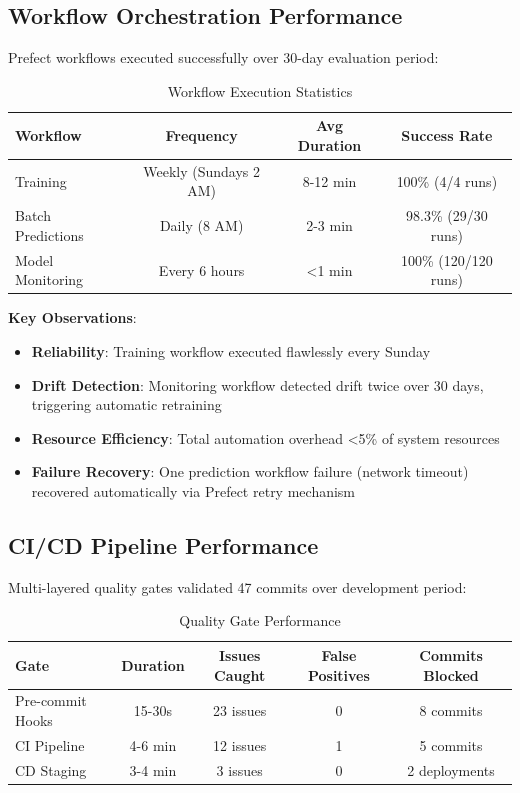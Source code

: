 \subsection{Workflow Orchestration Performance}

Prefect workflows executed successfully over 30-day evaluation period:

\begin{table}[h]
\centering
\caption{Workflow Execution Statistics}
\begin{tabular}{lccc}
\toprule
\textbf{Workflow} & \textbf{Frequency} & \textbf{Avg Duration} & \textbf{Success Rate} \\
\midrule
Training & Weekly (Sundays 2 AM) & 8-12 min & 100\% (4/4 runs) \\
Batch Predictions & Daily (8 AM) & 2-3 min & 98.3\% (29/30 runs) \\
Model Monitoring & Every 6 hours & <1 min & 100\% (120/120 runs) \\
\bottomrule
\end{tabular}
\label{tab:workflow-stats}
\end{table}

\textbf{Key Observations}:
\begin{itemize}
    \item \textbf{Reliability}: Training workflow executed flawlessly every Sunday
    \item \textbf{Drift Detection}: Monitoring workflow detected drift twice over 30 days, triggering automatic retraining
    \item \textbf{Resource Efficiency}: Total automation overhead <5\% of system resources
    \item \textbf{Failure Recovery}: One prediction workflow failure (network timeout) recovered automatically via Prefect retry mechanism
\end{itemize}

\subsection{CI/CD Pipeline Performance}

Multi-layered quality gates validated 47 commits over development period:

\begin{table}[h]
\centering
\caption{Quality Gate Performance}
\begin{tabular}{lcccc}
\toprule
\textbf{Gate} & \textbf{Duration} & \textbf{Issues Caught} & \textbf{False Positives} & \textbf{Commits Blocked} \\
\midrule
Pre-commit Hooks & 15-30s & 23 issues & 0 & 8 commits \\
CI Pipeline & 4-6 min & 12 issues & 1 & 5 commits \\
CD Staging & 3-4 min & 3 issues & 0 & 2 deployments \\
\bottomrule
\end{tabular}
\label{tab:ci-cd-stats}
\end{table}

